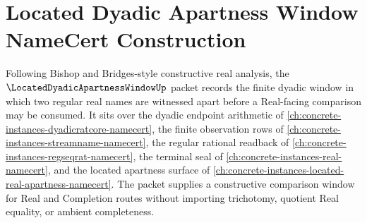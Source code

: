 \chapter{Located Dyadic Apartness Window NameCert Construction}
\label{ch:concrete-instances-located-dyadic-apartness-window-namecert}

Following Bishop and Bridges-style constructive real analysis, the $\LocatedDyadicApartnessWindowUp$ packet records the finite dyadic window in which two regular real names are witnessed apart before a Real-facing comparison may be consumed. It sits over the dyadic endpoint arithmetic of \autoref{ch:concrete-instances-dyadicratcore-namecert}, the finite observation rows of \autoref{ch:concrete-instances-streamname-namecert}, the regular rational readback of \autoref{ch:concrete-instances-regseqrat-namecert}, the terminal seal of \autoref{ch:concrete-instances-real-namecert}, and the located apartness surface of \autoref{ch:concrete-instances-located-real-apartness-namecert}. The packet supplies a constructive comparison window for Real and Completion routes without importing trichotomy, quotient Real equality, or ambient completeness.

